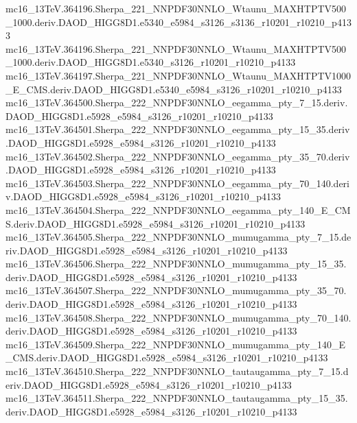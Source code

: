 \begin{scriptsize}
mc16\_13TeV.364196.Sherpa\_221\_NNPDF30NNLO\_Wtaunu\_MAXHTPTV500\_1000.deriv.DAOD\_HIGG8D1.e5340\_e5984\_s3126\_s3136\_r10201\_r10210\_p4133 \\
mc16\_13TeV.364196.Sherpa\_221\_NNPDF30NNLO\_Wtaunu\_MAXHTPTV500\_1000.deriv.DAOD\_HIGG8D1.e5340\_s3126\_r10201\_r10210\_p4133 \\
mc16\_13TeV.364197.Sherpa\_221\_NNPDF30NNLO\_Wtaunu\_MAXHTPTV1000\_E\_CMS.deriv.DAOD\_HIGG8D1.e5340\_e5984\_s3126\_r10201\_r10210\_p4133 \\
mc16\_13TeV.364500.Sherpa\_222\_NNPDF30NNLO\_eegamma\_pty\_7\_15.deriv.DAOD\_HIGG8D1.e5928\_e5984\_s3126\_r10201\_r10210\_p4133 \\
mc16\_13TeV.364501.Sherpa\_222\_NNPDF30NNLO\_eegamma\_pty\_15\_35.deriv.DAOD\_HIGG8D1.e5928\_e5984\_s3126\_r10201\_r10210\_p4133 \\
mc16\_13TeV.364502.Sherpa\_222\_NNPDF30NNLO\_eegamma\_pty\_35\_70.deriv.DAOD\_HIGG8D1.e5928\_e5984\_s3126\_r10201\_r10210\_p4133 \\
mc16\_13TeV.364503.Sherpa\_222\_NNPDF30NNLO\_eegamma\_pty\_70\_140.deriv.DAOD\_HIGG8D1.e5928\_e5984\_s3126\_r10201\_r10210\_p4133 \\
mc16\_13TeV.364504.Sherpa\_222\_NNPDF30NNLO\_eegamma\_pty\_140\_E\_CMS.deriv.DAOD\_HIGG8D1.e5928\_e5984\_s3126\_r10201\_r10210\_p4133 \\
mc16\_13TeV.364505.Sherpa\_222\_NNPDF30NNLO\_mumugamma\_pty\_7\_15.deriv.DAOD\_HIGG8D1.e5928\_e5984\_s3126\_r10201\_r10210\_p4133 \\
mc16\_13TeV.364506.Sherpa\_222\_NNPDF30NNLO\_mumugamma\_pty\_15\_35.deriv.DAOD\_HIGG8D1.e5928\_e5984\_s3126\_r10201\_r10210\_p4133 \\
mc16\_13TeV.364507.Sherpa\_222\_NNPDF30NNLO\_mumugamma\_pty\_35\_70.deriv.DAOD\_HIGG8D1.e5928\_e5984\_s3126\_r10201\_r10210\_p4133 \\
mc16\_13TeV.364508.Sherpa\_222\_NNPDF30NNLO\_mumugamma\_pty\_70\_140.deriv.DAOD\_HIGG8D1.e5928\_e5984\_s3126\_r10201\_r10210\_p4133 \\
mc16\_13TeV.364509.Sherpa\_222\_NNPDF30NNLO\_mumugamma\_pty\_140\_E\_CMS.deriv.DAOD\_HIGG8D1.e5928\_e5984\_s3126\_r10201\_r10210\_p4133 \\
mc16\_13TeV.364510.Sherpa\_222\_NNPDF30NNLO\_tautaugamma\_pty\_7\_15.deriv.DAOD\_HIGG8D1.e5928\_e5984\_s3126\_r10201\_r10210\_p4133 \\
mc16\_13TeV.364511.Sherpa\_222\_NNPDF30NNLO\_tautaugamma\_pty\_15\_35.deriv.DAOD\_HIGG8D1.e5928\_e5984\_s3126\_r10201\_r10210\_p4133 \\

\end{scriptsize}
